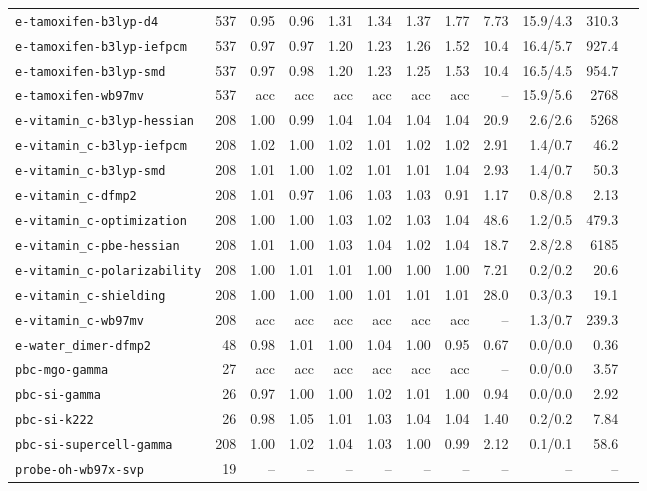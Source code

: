 \begin{longtable}{lrrrrrrrrrrr}
\texttt{e-tamoxifen-b3lyp-d4} & 537 & 0.95 & 0.96 & 1.31 & 1.34 & 1.37 & 1.77 & 7.73 & 15.9/4.3 & 310.3 \\
\texttt{e-tamoxifen-b3lyp-iefpcm} & 537 & 0.97 & 0.97 & 1.20 & 1.23 & 1.26 & 1.52 & 10.4 & 16.4/5.7 & 927.4 \\
\texttt{e-tamoxifen-b3lyp-smd} & 537 & 0.97 & 0.98 & 1.20 & 1.23 & 1.25 & 1.53 & 10.4 & 16.5/4.5 & 954.7 \\
\texttt{e-tamoxifen-wb97mv} & 537 & acc & acc & acc & acc & acc & acc & -- & 15.9/5.6 & 2768 \\
\texttt{e-vitamin\_c-b3lyp-hessian} & 208 & 1.00 & 0.99 & 1.04 & 1.04 & 1.04 & 1.04 & 20.9 & 2.6/2.6 & 5268 \\
\texttt{e-vitamin\_c-b3lyp-iefpcm} & 208 & 1.02 & 1.00 & 1.02 & 1.01 & 1.02 & 1.02 & 2.91 & 1.4/0.7 & 46.2 \\
\texttt{e-vitamin\_c-b3lyp-smd} & 208 & 1.01 & 1.00 & 1.02 & 1.01 & 1.01 & 1.04 & 2.93 & 1.4/0.7 & 50.3 \\
\texttt{e-vitamin\_c-dfmp2} & 208 & 1.01 & 0.97 & 1.06 & 1.03 & 1.03 & 0.91 & 1.17 & 0.8/0.8 & 2.13 \\
\texttt{e-vitamin\_c-optimization} & 208 & 1.00 & 1.00 & 1.03 & 1.02 & 1.03 & 1.04 & 48.6 & 1.2/0.5 & 479.3 \\
\texttt{e-vitamin\_c-pbe-hessian} & 208 & 1.01 & 1.00 & 1.03 & 1.04 & 1.02 & 1.04 & 18.7 & 2.8/2.8 & 6185 \\
\texttt{e-vitamin\_c-polarizability} & 208 & 1.00 & 1.01 & 1.01 & 1.00 & 1.00 & 1.00 & 7.21 & 0.2/0.2 & 20.6 \\
\texttt{e-vitamin\_c-shielding} & 208 & 1.00 & 1.00 & 1.00 & 1.01 & 1.01 & 1.01 & 28.0 & 0.3/0.3 & 19.1 \\
\texttt{e-vitamin\_c-wb97mv} & 208 & acc & acc & acc & acc & acc & acc & -- & 1.3/0.7 & 239.3 \\
\texttt{e-water\_dimer-dfmp2} & 48 & 0.98 & 1.01 & 1.00 & 1.04 & 1.00 & 0.95 & 0.67 & 0.0/0.0 & 0.36 \\
\texttt{pbc-mgo-gamma} & 27 & acc & acc & acc & acc & acc & acc & -- & 0.0/0.0 & 3.57 \\
\texttt{pbc-si-gamma} & 26 & 0.97 & 1.00 & 1.00 & 1.02 & 1.01 & 1.00 & 0.94 & 0.0/0.0 & 2.92 \\
\texttt{pbc-si-k222} & 26 & 0.98 & 1.05 & 1.01 & 1.03 & 1.04 & 1.04 & 1.40 & 0.2/0.2 & 7.84 \\
\texttt{pbc-si-supercell-gamma} & 208 & 1.00 & 1.02 & 1.04 & 1.03 & 1.00 & 0.99 & 2.12 & 0.1/0.1 & 58.6 \\
\texttt{probe-oh-wb97x-svp} & 19 & -- & -- & -- & -- & -- & -- & -- & -- & -- \\
\end{longtable}
